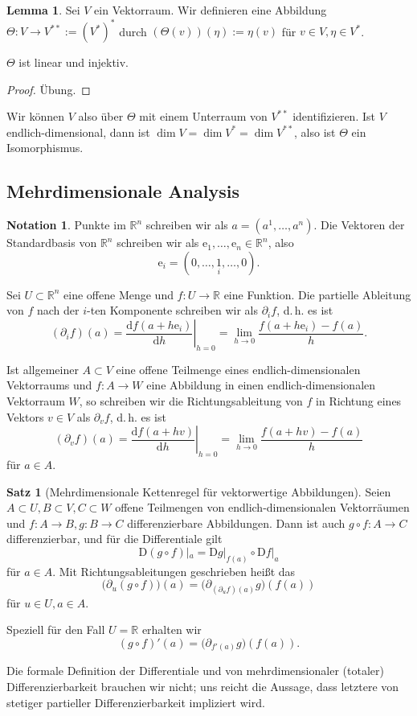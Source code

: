 \documentclass[a4paper]{scrreprt}
\numberwithin{equation}{chapter}
\newcommand{\D}{\mathrm{d}}
\newcommand{\DD}{\mathrm{D}}
\newcommand{\e}{\mathrm{e}}
\newcommand{\R}{\mathbb{R}}
\theoremstyle{definition}
\newtheorem{lemma}[defn]{Lemma}
\newtheorem{satz}[defn]{Satz}
\newtheorem{nota}[defn]{Notation}
\newcommand{\bewUeb}{\begin{proof}Übung.\end{proof}}
\begin{document}
\begin{lemma}\label{lemma:Bidualraum}
	Sei $V$ ein Vektorraum. Wir definieren eine Abbildung $\Theta\colon V \to V^{**} := (V^*)^*$ durch $(\Theta(v))(\eta) := \eta(v)$ für $v \in V, \eta \in V^*$.

	$\Theta$ ist linear und injektiv.

	\bewUeb
\end{lemma}
Wir können $V$ also über $\Theta$ mit einem Unterraum von $V^{**}$ identifizieren. Ist $V$ endlich-dimensional, dann ist $\dim V = \dim V^* = \dim V^{**}$, also ist $\Theta$ ein Isomorphismus.

\subsection{Mehrdimensionale Analysis}
\begin{nota}
	Punkte im $\mathbb R^n$ schreiben wir als $a = (a^1, \dots, a^n)$. Die Vektoren der Standardbasis von $\mathbb R^n$ schreiben wir als $\e_1, \dots, \e_n \in \mathbb R^n$, also \[\e_i = (0,\dots,\underset{i}{1},\dots,0).\]

	Sei $U \subset \mathbb R^n$ eine offene Menge und $f\colon U \to \mathbb R$ eine Funktion. Die partielle Ableitung von $f$ nach der $i$-ten Komponente schreiben wir als $\partial_i f$, d.\,h. es ist
	\[(\partial_i f)(a) = \left.\frac{\D f(a + h \e_i)}{\D h}\right|_{h=0} = \lim_{h\to 0} \frac{f(a + h \e_i) - f(a)}{h}.\]

	Ist allgemeiner $A \subset V$ eine offene Teilmenge eines endlich-dimensionalen Vektorraums und $f\colon A \to W$ eine Abbildung in einen endlich-dimensionalen Vektorraum $W$, so schreiben wir die Richtungsableitung von $f$ in Richtung eines Vektors $v\in V$ als $\partial_v f$, d.\,h. es ist
	\[(\partial_v f)(a) = \left.\frac{\D f(a + h v)}{\D h}\right|_{h=0} = \lim_{h\to 0} \frac{f(a + h v) - f(a)}{h}\]
	für $a \in A$.
\end{nota}

\begin{satz}[Mehrdimensionale Kettenregel für vektorwertige Abbildungen]
	Seien $A \subset U, B \subset V, C \subset W$ offene Teilmengen von endlich-dimensionalen Vektorräumen und $f\colon A\to B, g\colon B \to C$ differenzierbare Abbildungen. Dann ist auch $g\circ f\colon A \to C$ differenzierbar, und für die Differentiale gilt
	\[\DD(g\circ f)|_a = \DD g|_{f(a)} \circ \DD f|_a\]
	für $a \in A$. Mit Richtungsableitungen geschrieben heißt das
	\[\Big(\partial_u(g\circ f)\Big)(a) = \Big(\partial_{(\partial_u f)(a)} g\Big)(f(a))\]
	für $u \in U, a\in A$.

	Speziell für den Fall $U = \R$ erhalten wir
	\[(g\circ f)'(a) = \Big(\partial_{f'(a)} g\Big)(f(a)).\]
\end{satz}
Die formale Definition der Differentiale und von mehrdimensionaler (totaler) Differenzierbarkeit brauchen wir nicht; uns reicht die Aussage, dass letztere von stetiger partieller Differenzierbarkeit impliziert wird.
\end{document}
